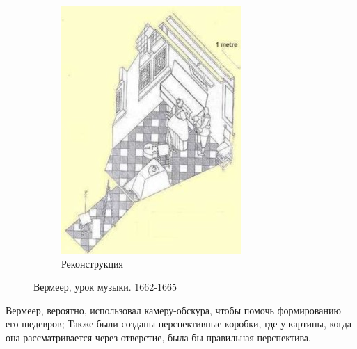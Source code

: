 \documentclass[a4paper, 14pt]{extarticle}
\begin{document}
\begin{figure}[h]
\begin{subfigure}[b]{0.45\textwidth}
		\includegraphics[width=\textwidth]{l5/S010.jpg}
		\caption{Реконструкция}
	\end{subfigure}
	\caption{Вермеер, урок музыки. 1662-1665}
\end{figure}
Вермеер, вероятно, использовал камеру-обскура, чтобы помочь формированию его шедевров; Также были созданы перспективные коробки, где у картины, когда она рассматривается через отверстие, была бы правильная перспектива.

\FloatBarrier
\end{document}
